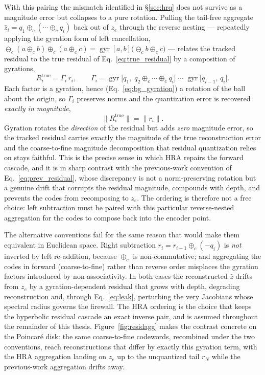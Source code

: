 \documentclass[12pt]{report}
\begin{document}
With this pairing the mismatch identified in \S\ref{sec:hrq} does not survive as a magnitude error but collapses to a pure rotation. Pulling the tail-free aggregate $\hat z_i = q_1\oplus_c(\cdots\oplus_c q_i)$ back out of $z_e$ through the reverse nesting --- repeatedly applying the gyration form of left cancellation, $\ominus_c(a\oplus_c b)\oplus_c(a\oplus_c c) = \operatorname{gyr}[a,b]\big(\ominus_c b\oplus_c c\big)$ --- relates the tracked residual to the true residual of Eq.~\ref{eq:true_residual} by a composition of gyrations,
\begin{equation}
    \label{eq:hrq_gyration}
    R_i^{\text{true}} = \Gamma_i\, r_i,
    \qquad
    \Gamma_i = \operatorname{gyr}\!\big[q_1,\;q_2\oplus_c\cdots\oplus_c q_i\big]\;\cdots\;\operatorname{gyr}\!\big[q_{i-1},\,q_i\big].
\end{equation}
Each factor is a gyration, hence (Eq.~\ref{eq:bg_gyration}) a rotation of the ball about the origin, so $\Gamma_i$ preserves norms and the quantization error is recovered \emph{exactly in magnitude},
\begin{equation}
    \label{eq:hrq_norm}
    \big\|R_i^{\text{true}}\big\| = \big\|r_i\big\| .
\end{equation}
Gyration rotates the \emph{direction} of the residual but adds \emph{zero} magnitude error, so the tracked residual carries exactly the magnitude of the true reconstruction error and the coarse-to-fine magnitude decomposition that residual quantization relies on stays faithful. This is the precise sense in which HRA repairs the forward cascade, and it is in sharp contrast with the previous-work convention of Eq.~\ref{eq:prev_residual}, whose discrepancy is not a norm-preserving rotation but a genuine drift that corrupts the residual magnitude, compounds with depth, and prevents the codes from recomposing to $z_e$. The ordering is therefore not a free choice: left subtraction must be paired with this particular reverse-nested aggregation for the codes to compose back into the encoder point.

The alternative conventions fail for the same reason that would make them equivalent in Euclidean space. Right subtraction $r_i = r_{i-1}\oplus_c(-q_i)$ is \emph{not} inverted by left re-addition, because $\oplus_c$ is non-commutative; and aggregating the codes in forward (coarse-to-fine) rather than reverse order misplaces the gyration factors introduced by non-associativity. In both cases the reconstructed $\hat z$ drifts from $z_e$ by a gyration-dependent residual that grows with depth, degrading reconstruction and, through Eq.~\ref{eq:leak}, perturbing the very Jacobians whose spectral radius governs the firewall. The HRA ordering is the choice that keeps the hyperbolic residual cascade an exact inverse pair, and is assumed throughout the remainder of this thesis. Figure~\ref{fig:residagg} makes the contrast concrete on the Poincar\'e disk: the same coarse-to-fine codewords, recombined under the two conventions, reach reconstructions that differ by exactly this gyration term, with the HRA aggregation landing on $z_e$ up to the unquantized tail $r_N$ while the previous-work aggregation drifts away.
\end{document}
